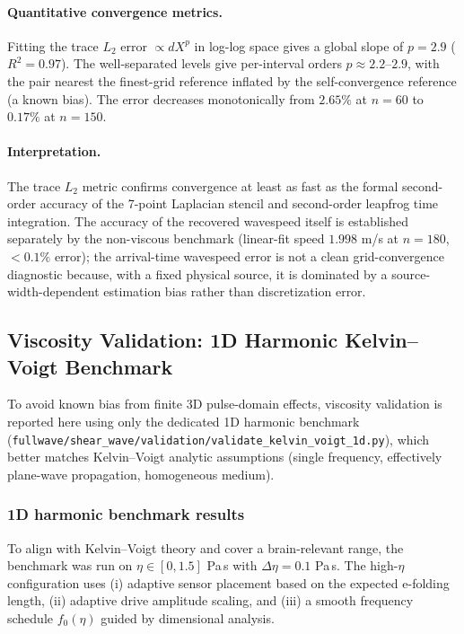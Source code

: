 \documentclass[11pt]{article}
\begin{document}
\paragraph{Quantitative convergence metrics.}
Fitting the trace \(L_2\) error \(\propto dX^p\) in log-log space gives a global slope of \(p=2.9\) (\(R^2=0.97\)). The well-separated levels give per-interval orders \(p\approx2.2\)--\(2.9\), with the pair nearest the finest-grid reference inflated by the self-convergence reference (a known bias). The error decreases monotonically from \(2.65\%\) at \(n=60\) to \(0.17\%\) at \(n=150\).

\paragraph{Interpretation.}
The trace \(L_2\) metric confirms convergence at least as fast as the formal second-order accuracy of the 7-point Laplacian stencil and second-order leapfrog time integration. The accuracy of the recovered wavespeed itself is established separately by the non-viscous benchmark (linear-fit speed \(1.998\) m/s at \(n=180\), \(<0.1\%\) error); the arrival-time wavespeed error is not a clean grid-convergence diagnostic because, with a fixed physical source, it is dominated by a source-width-dependent estimation bias rather than discretization error.

\subsection{Viscosity Validation: 1D Harmonic Kelvin--Voigt Benchmark}
To avoid known bias from finite 3D pulse-domain effects, viscosity validation is reported here using only the dedicated 1D harmonic benchmark (\texttt{fullwave/shear\_wave/validation/validate\_kelvin\_voigt\_1d.py}), which better matches Kelvin--Voigt analytic assumptions (single frequency, effectively plane-wave propagation, homogeneous medium).

\subsubsection{1D harmonic benchmark results}
To align with Kelvin--Voigt theory and cover a brain-relevant range, the benchmark was run on \(\eta\in[0,1.5]\) Pa\,s with \(\Delta\eta=0.1\) Pa\,s. The high-\(\eta\) configuration uses (i) adaptive sensor placement based on the expected e-folding length, (ii) adaptive drive amplitude scaling, and (iii) a smooth frequency schedule \(f_0(\eta)\) guided by dimensional analysis.
\end{document}
